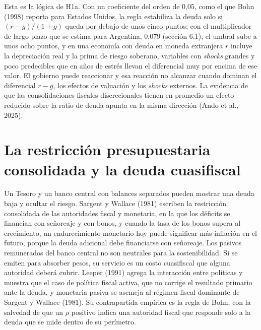 Esta es la lógica de H1a. Con un coeficiente del orden de 0,05, como el
que Bohn (1998) reporta para Estados Unidos, la regla estabiliza la
deuda solo si \((r-g)/(1+g)\) queda por debajo de unos cinco puntos; con
el multiplicador de largo plazo que se estima para Argentina, 0,079
(sección 6.1), el umbral sube a unos ocho puntos, y en una economía con
deuda en moneda extranjera \(r\) incluye la depreciación real y la prima
de riesgo soberano, variables con \emph{shocks} grandes y poco
predecibles que en años de estrés llevan el diferencial muy por encima
de ese valor. El gobierno puede reaccionar y esa reacción no alcanzar
cuando dominan el diferencial \(r-g\), los efectos de valuación y los
\emph{shocks} externos. La evidencia de que las consolidaciones fiscales
discrecionales tienen en promedio un efecto reducido sobre la ratio de
deuda apunta en la misma dirección (Ando et al., 2025).

\section{La restricción presupuestaria consolidada y la deuda
cuasifiscal}

Un Tesoro y un banco central con balances separados pueden mostrar una
deuda baja y ocultar el riesgo. Sargent y Wallace (1981) escriben la
restricción consolidada de las autoridades fiscal y monetaria, en la que
los déficits se financian con señoreaje y con bonos, y cuando la tasa de
los bonos supera al crecimiento, un endurecimiento monetario hoy puede
significar más inflación en el futuro, porque la deuda adicional debe
financiarse con señoreaje. Los pasivos remunerados del banco central no
son neutrales para la sostenibilidad. Si se emiten para absorber pesos,
su servicio es un costo cuasifiscal que alguna autoridad deberá cubrir.
Leeper (1991) agrega la interacción entre políticas y muestra que el
caso de política fiscal activa, que no corrige el resultado primario
ante la deuda, y monetaria pasiva se asemeja al régimen fiscal dominante
de Sargent y Wallace (1981). Su contrapartida empírica es la regla de
Bohn, con la salvedad de que un \(\rho\) positivo indica una autoridad
fiscal que responde solo a la deuda que se mide dentro de su perímetro.

